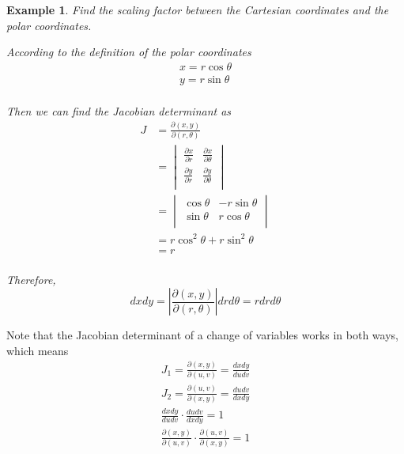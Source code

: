 \documentclass{article}
\newtheorem{example}{Example}
\begin{document}
\begin{example}
  Find the scaling factor between the Cartesian coordinates and the polar 
  coordinates.

  According to the definition of the polar coordinates
  \begin{gather*}
    x = r \cos\theta \\
    y = r \sin\theta \\
  \end{gather*}

  Then we can find the Jacobian determinant as
  \begin{equation*}
    \begin{split}
      J &= \frac{\partial(x, y)}{\partial(r, \theta)} \\
        &= \begin{vmatrix}
             \frac{\partial x}{\partial r} & \frac{\partial x}{\partial \theta} \\
             \frac{\partial y}{\partial r} & \frac{\partial y}{\partial \theta} \\
           \end{vmatrix} \\
        &= \begin{vmatrix}
             \cos\theta & -r \sin\theta \\
             \sin\theta & r \cos\theta \\
           \end{vmatrix} \\
        &= r \cos^2\theta + r \sin^2\theta \\
        &= r \\
    \end{split}
  \end{equation*}

  Therefore, 
  \begin{equation*}
    dx dy = |\frac{\partial(x, y)}{\partial(r, \theta)}| dr d\theta = r dr d\theta
  \end{equation*}
\end{example}

Note that the Jacobian determinant of a change of variables works in both ways, 
which means
\begin{gather*}
  J_1 = \frac{\partial(x, y)}{\partial(u, v)} = \frac{dx dy}{du dv} \\
  J_2 = \frac{\partial(u, v)}{\partial(x, y)} = \frac{du dv}{dx dy} \\
  \frac{dx dy}{du dv} \cdot \frac{du dv}{dx dy} = 1 \\
  \frac{\partial(x, y)}{\partial(u, v)} \cdot \frac{\partial(u, v)}{\partial(x, y)} = 1 \\
\end{gather*}
\end{document}
